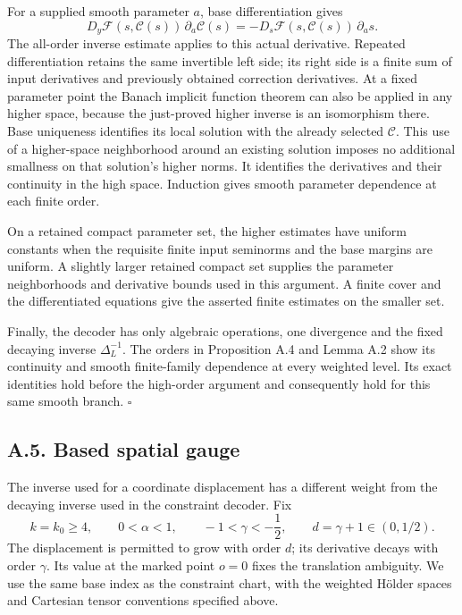 \documentclass[
  english,
  11pt,
  reqno]{amsart}
\begin{document}
For a supplied smooth parameter \(a\), base differentiation gives%
 \[
D_y\mathcal F(s,\mathcal C(s))\,\partial_a\mathcal C(s)
=-D_s\mathcal F(s,\mathcal C(s))\,\partial_a s.
\] The all-order inverse estimate applies to this actual derivative.
Repeated differentiation retains the same invertible left side; its
right side is a finite sum of input derivatives and previously obtained
correction derivatives. At a fixed parameter point the Banach implicit
function theorem can also be applied in any higher space, because the
just-proved higher inverse is an isomorphism there. Base uniqueness
identifies its local solution with the already selected \(\mathcal C\).
This use of a higher-space neighborhood around an existing solution
imposes no additional smallness on that solution's higher norms. It
identifies the derivatives and their continuity in the high space.
Induction gives smooth parameter dependence at each finite order.

On a retained compact parameter set, the higher estimates have uniform
constants when the requisite finite input seminorms and the base margins
are uniform. A slightly larger retained compact set supplies the
parameter neighborhoods and derivative bounds used in this argument. A
finite cover and the differentiated equations give the asserted finite
estimates on the smaller set.

Finally, the decoder has only algebraic operations, one divergence and
the fixed decaying inverse \(\Delta_L^{-1}\). The orders in Proposition
A.4 and Lemma A.2 show its continuity and smooth finite-family
dependence at every weighted level. Its exact identities hold before the
high-order argument and consequently hold for this same smooth branch.
\hfill\(\square\)

\subsection{A.5. Based spatial gauge}\label{a.5.-based-spatial-gauge}\label{sec:online-anchored-spatial-gauge}

The inverse used for a coordinate displacement has a different weight
from the decaying inverse used in the constraint decoder. Fix%
 \[
k=k_0\ge4,\qquad 0<\alpha<1,\qquad -1<\gamma<-\frac12,
\qquad d=\gamma+1\in(0,1/2).
\] The displacement is permitted to grow with order \(d\); its
derivative decays with order \(\gamma\). Its value at the marked point
\(o=0\) fixes the translation ambiguity. We use the same base index as
the constraint chart, with the weighted Hölder spaces and Cartesian
tensor conventions specified above.
\end{document}
